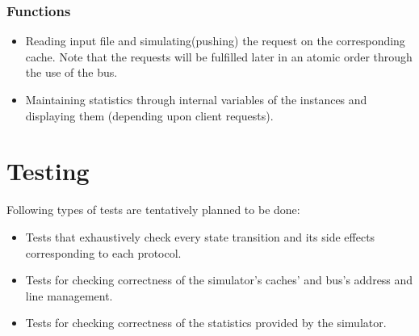 \documentclass{article}
\begin{document}
\subsubsection*{Functions}
\begin{itemize}
\item Reading input file and simulating(pushing) the request on the corresponding cache. Note that the requests will be fulfilled later in an atomic order through the use of the bus.
\item Maintaining statistics through internal variables of the instances and displaying them (depending upon client requests).
\end{itemize}
\section{Testing}
Following types of tests are tentatively planned to be done:
\begin{itemize}
\item Tests that exhaustively check every state transition and its side effects corresponding to each protocol.
\item Tests for checking correctness of the simulator's caches' and bus's address and line management.
\item Tests for checking correctness of the statistics provided by the simulator.
\end{itemize}
\end{document}
